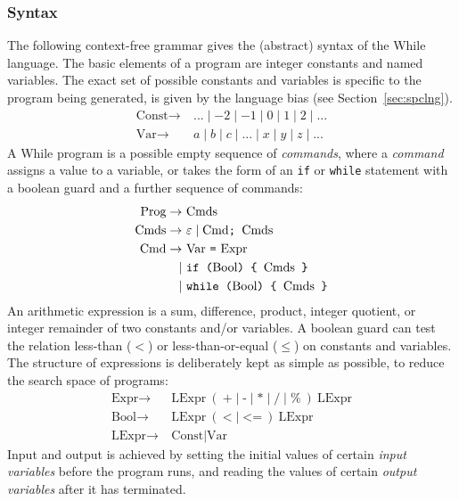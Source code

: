 \documentclass[a4paper,twoside,notitlepage]{article}
\newcommand{\ttt}{\texttt}
\newcommand{\trm}{\textrm}
\begin{document}
\subsubsection{Syntax}
The following context-free grammar gives the (abstract) syntax of the While 
language. The basic elements of a program are integer constants and named 
variables. The exact set of possible constants and variables is specific to 
the program being generated, is given by the language bias (see 
Section~\ref{sec:spclng}).
\begin{align*}
   \trm{Const} \to\ & ... \mid -2 \mid -1 \mid 0 \mid 1 \mid 2 \mid ...
\\ \trm{Var}   \to\ & a \mid b \mid c \mid ... \mid x \mid y \mid z \mid ...
\end{align*}
A While program is a possible empty sequence of \emph{commands}, where a 
\emph{command} assigns a value to a variable, or takes the form of an \ttt{if} 
or \ttt{while} statement with a boolean guard and a further sequence of 
commands:
\begin{align*}
   \trm{Prog}  \to\ & \trm{Cmds}
\\ \trm{Cmds}  \to\ & \varepsilon \mid \trm{Cmd} \ttt{; } \trm{Cmds}
\\ \trm{Cmd}   \to\ & \trm{Var} \ \ttt{=} \ \trm{Expr}
\\            \mid\ & \ttt{if (} \trm{Bool} \ttt{) \char`\{\ } \trm{Cmds} \ttt{ \char`\}}
\\            \mid\ & \ttt{while (} \trm{Bool} \ttt{) \char`\{\ } \trm{Cmds} \ttt{ \char`\}}
\end{align*}
An arithmetic expression is a sum, difference, product, integer quotient, or 
integer remainder of two constants and/or variables. A boolean guard can test 
the relation less-than ($<$) or less-than-or-equal ($\leq$) on constants and 
variables. The structure of expressions is deliberately kept as simple as 
possible, to reduce the search space of programs:
\begin{align*}
   \trm{Expr}  \to\ & \trm{LExpr}\ (\ \ttt{+} \mid \ttt{-} \mid \ttt{*} \mid
                                      \ttt{/} \mid \ttt{\%} \ )\ \trm{LExpr}
\\ \trm{Bool}  \to\ & \trm{LExpr}\ (\ \ttt{<} \mid \ttt{<=}\ )\ \trm{LExpr}
\\ \trm{LExpr} \to\ & \trm{Const} \mid \trm{Var}
\end{align*}
Input and output is achieved by setting the initial values of certain 
\emph{input variables} before the program runs, and reading the values of 
certain \emph{output variables} after it has terminated.
\end{document}
